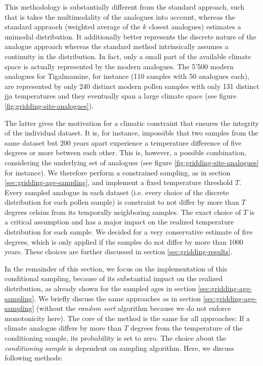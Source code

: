 \begin{refsection}
This methodology is substantially different from the standard approach, such that is takes the multimodality of the analogues into account, whereas the standard appraoch (weighted average of the $k$ closest analogues) estimates a unimodal distribution. It additionally better represents the discrete nature of the analogue approach whereas the standard method intrinsically assumes a continuity in the distribution. In fact, only a small part of the available climate space is actually represented by the modern analogues. The 5'500 modern analogues for Tigalmamine, for instance (110 samples with 50 analogues each), are represented by only 240 distinct modern pollen samples with only 131 distinct \gls{jja} temperatures and they eventually span a large climate space (see figure \ref{fig:gridding-site-analogues}).

The latter gives the motivation for a climatic constraint that ensures the integrity of the individual dataset. It is, for instance, impossible that two samples from the same dataset but 200 years apart experience a temperature difference of five degrees or more between each other. This is, however, a possible combination, considering the underlying set of analogues (see figure \ref{fig:gridding-site-analogues} for instance). We therefore perform a constrained sampling, as in section \ref{sec:gridding-age-sampling}, and implement a fixed temperature threshold $T$. Every sampled analogue in each dataset (i.e. every choice of the discrete distribution for each pollen sample) is constraint to not differ by more than $T$ degrees celsius from its temporally neighboring samples. The exact choice of $T$ is a critical assumption and has a major impact on the realized temperature distribution for each sample. We decided for a very conservative estimate of five degrees, which is only applied if the samples do not differ by more than 1000 years. These choices are further discussed in section \ref{sec:gridding-results}.

In the remainder of this section, we focus on the implementation of this conditional sampling, because of its substantial impact on the realized distribution, as already shown for the sampled ages in section \ref{sec:gridding-age-sampling}. We briefly discuss the same approaches as in section \ref{sec:gridding-age-sampling} (without the \textit{random sort} algorithm because we do not enforce monotonicity here). The core of the method is the same for all approaches: If a climate analogue differs by more than $T$ degrees from the temperature of the conditioning sample, its probability is set to zero. The choice about the \textit{conditioning sample} is dependent on sampling algorithm. Here, we discuss following methods:


\end{refsection}
